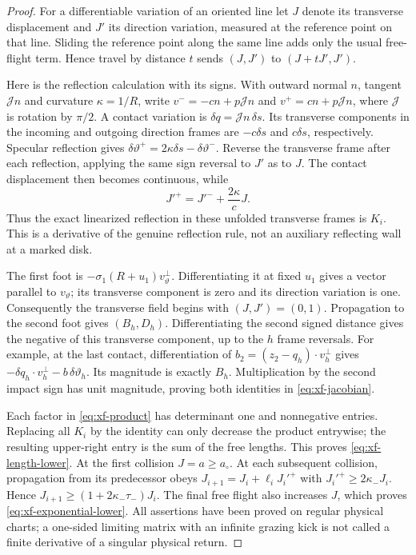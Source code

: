 \begin{proof}
For a differentiable variation of an oriented line let $J$ denote its
transverse displacement and $J'$ its direction variation, measured at
the reference point on that line. Sliding the reference point along the
same line adds only the usual free-flight term. Hence travel by distance
$t$ sends $(J,J')$ to $(J+tJ',J')$.

Here is the reflection calculation with its signs. With outward normal
$n$, tangent $\mathcal J n$ and curvature $\kappa=1/R$, write
$v^-=-cn+p\mathcal Jn$ and $v^+=cn+p\mathcal Jn$, where
$\mathcal J$ is rotation by $\pi/2$. A contact variation is
$\delta q=\mathcal Jn\,\delta s$. Its transverse components in the
incoming and outgoing direction frames are $-c\delta s$ and
$c\delta s$, respectively. Specular reflection gives
$\delta\vartheta^+=2\kappa\delta s-\delta\vartheta^-$.
Reverse the transverse frame after each reflection, applying the same
sign reversal to $J'$ as to $J$. The contact displacement then becomes
continuous, while
\[
              J'^+=J'^-+\frac{2\kappa}{c}J.
\]
Thus the exact linearized reflection in these unfolded transverse
frames is $K_i$. This is a derivative of the genuine reflection rule,
not an auxiliary reflecting wall at a marked disk.

The first foot is $-\sigma_1(R+u_1)v_\vartheta^\perp$. Differentiating
it at fixed $u_1$ gives a vector parallel to $v_\vartheta$; its
transverse component is zero and its direction variation is one.
Consequently the transverse field begins with $(J,J')=(0,1)$.
Propagation to the second foot gives $(B_h,D_h)$. Differentiating the
second signed distance gives the negative of this transverse
component, up to the $h$ frame reversals. For example, at the last
contact, differentiation of
$b_2=(z_2-q_h)\cdot v_h^\perp$ gives
$-\delta q_h\cdot v_h^\perp-b\,\delta\vartheta_h$.
Its magnitude is exactly $B_h$. Multiplication by the second impact
sign has unit magnitude, proving both identities in
\eqref{eq:xf-jacobian}.

Each factor in \eqref{eq:xf-product} has determinant one and
nonnegative entries. Replacing all $K_i$ by the identity can only
decrease the product entrywise; the resulting upper-right entry is
the sum of the free lengths. This proves
\eqref{eq:xf-length-lower}. At the first collision $J=a\ge a_\circ$.
At each subsequent collision, propagation from its predecessor obeys
$J_{i+1}=J_i+\ell_iJ_i'^+$ with
$J_i'^+\ge 2\kappa_-J_i$. Hence
$J_{i+1}\ge(1+2\kappa_-\tau_-)J_i$. The final free flight also
increases $J$, which proves \eqref{eq:xf-exponential-lower}.
All assertions have been proved on regular physical charts; a
one-sided limiting matrix with an infinite grazing kick is not
called a finite derivative of a singular physical return.
\end{proof}

